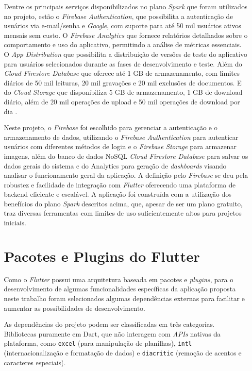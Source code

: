 Dentre os principais serviços disponibilizados no plano \textit{Spark} que foram 
utilizados no projeto, estão o \textit{Firebase Authentication}, 
que possibilita a autenticação de usuários via e-mail/senha e \textit{Google}, com suporte 
para até 50 mil usuários ativos mensais sem custo. O \textit{Firebase Analytics} que fornece 
relatórios detalhados sobre o comportamento e uso do aplicativo, permitindo a 
análise de métricas essenciais. O \textit{App Distribution} que possibilita a distribuição de versões 
de teste do aplicativo para usuários selecionados durante as fases de desenvolvimento e teste. 
Além do \textit{Cloud Firestore Database} que oferece até 1 GB de armazenamento, com limites diários de 50 
mil leituras, 20 mil gravações e 20 mil exclusões de documentos. E do \textit{Cloud Storage} que
disponibiliza 5 GB de armazenamento, 1 GB de download diário, além de 20 mil operações 
de upload e 50 mil operações de download por dia \cite{firebase2025}.

Neste projeto, o \textit{Firebase} foi escolhido para gerenciar a autenticação e o armazenamento de 
dados, utilizando o \textit{Firebase Authentication} para autenticar usuários com diferentes métodos de login e 
o \textit{Firebase Storage} para armazenar imagens, além do banco de dados NoSQL 
\textit{Cloud Firestore Database} para salvar os dados gerais do sistema e do Analytics para 
geração de \textit{dashboards} visando analisar o funcionamento geral da aplicação.
A definição pelo \textit{Firebase} se deu pela robustez e facilidade de integração com \textit{Flutter} 
oferecendo uma plataforma de backend eficiente e escalável. A aplicação foi construída com a 
utilização dos benefícios do plano \textit{Spark} descritos acima,
que, apesar de ser um plano gratuito, traz diversas ferramentas com limites de uso suficientemente 
altos para projetos iniciais.

\section{Pacotes e Plugins do Flutter}

Como o \textit{Flutter} possui uma arquitetura baseada em pacotes e \textit{plugins}, para o desenvolvimento 
de algumas funcionalidades específicas da aplicação proposta neste trabalho foram selecionados 
algumas dependências externas para facilitar e aumentar as possibilidades de desenvolvimento.

As dependências do projeto podem ser classificadas em três categorias. Bibliotecas puramente em Dart, 
que não interagem com \textit{APIs} nativas da 
plataforma, como \texttt{excel} (para manipulação de planilhas), \texttt{intl} (internacionalização 
e formatação de dados) e \texttt{diacritic} (remoção de acentos e caracteres especiais).


